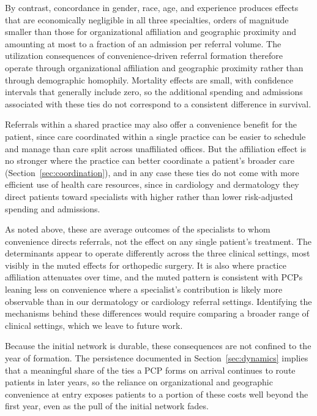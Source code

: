 \documentclass[12pt]{article}
\begin{document}
By contrast, concordance in gender, race, age, and experience produces effects that are economically negligible in all three specialties, orders of magnitude smaller than those for organizational affiliation and geographic proximity and amounting at most to a fraction of an admission per referral volume. The utilization consequences of convenience-driven referral formation therefore operate through organizational affiliation and geographic proximity rather than through demographic homophily. Mortality effects are small, with confidence intervals that generally include zero, so the additional spending and admissions associated with these ties do not correspond to a consistent difference in survival.

Referrals within a shared practice may also offer a convenience benefit for the patient, since care coordinated within a single practice can be easier to schedule and manage than care split across unaffiliated offices. But the affiliation effect is no stronger where the practice can better coordinate a patient's broader care (Section~\ref{sec:coordination}), and in any case these ties do not come with more efficient use of health care resources, since in cardiology and dermatology they direct patients toward specialists with higher rather than lower risk-adjusted spending and admissions.

As noted above, these are average outcomes of the specialists to whom convenience directs referrals, not the effect on any single patient's treatment. The determinants appear to operate differently across the three clinical settings, most visibly in the muted effects for orthopedic surgery. It is also where practice affiliation attenuates over time, and the muted pattern is consistent with PCPs leaning less on convenience where a specialist's contribution is likely more observable than in our dermatology or cardiology referral settings. Identifying the mechanisms behind these differences would require comparing a broader range of clinical settings, which we leave to future work.

Because the initial network is durable, these consequences are not confined to the year of formation. The persistence documented in Section~\ref{sec:dynamics} implies that a meaningful share of the ties a PCP forms on arrival continues to route patients in later years, so the reliance on organizational and geographic convenience at entry exposes patients to a portion of these costs well beyond the first year, even as the pull of the initial network fades.
\end{document}
